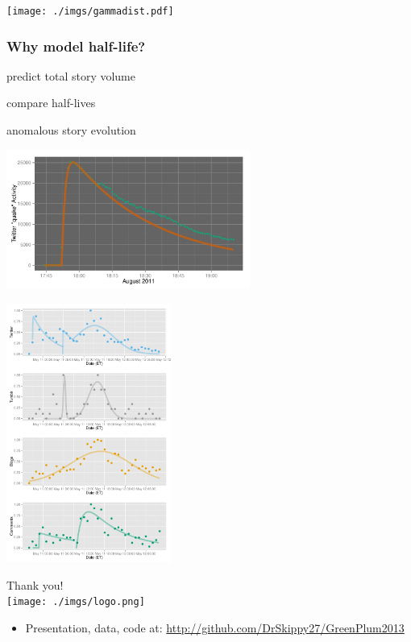 \documentclass{beamer}
\begin{document}

\begin{frame}
  \begin{center}
   \texttt{[image: ./imgs/gammadist.pdf]}
  \end{center}
\end{frame}
\begin{frame}\frametitle{Why model half-life?}
\begin{center}
\begin{itemize}
\Huge{
\item predict total story volume
\item compare half-lives
\item anomalous story evolution
}
\end{itemize}
\end{center}
\end{frame}


\begin{frame}
  \begin{center}
    \includegraphics[width=8cm]{./imgs/va_quake_fit1.pdf}
  \end{center}
\end{frame}




\begin{frame}
  \begin{center}
    \includegraphics[height=8.5cm]{./imgs/JPMorgan.pdf}
  \end{center}
\end{frame}


\begin{frame}
  \begin{center}
    {\Large Thank you!}  \\ [20pt]
    \texttt{[image: ./imgs/logo.png]} \\ [15pt]
    \begin{itemize}
    \item Presentation, data, code at: \url{http://github.com/DrSkippy27/GreenPlum2013}
    \end{itemize}
  \end{center}
\end{frame}
\end{document}
